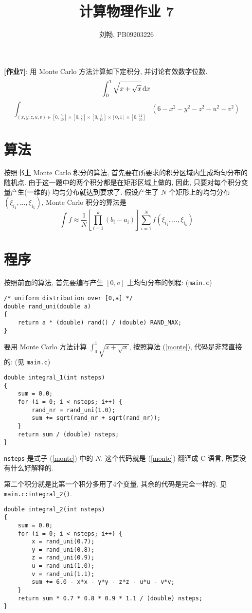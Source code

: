 \documentclass{ctexart}
\def\dd{{\rm d}}
\begin{document}
\title{计算物理作业 7}
\author{刘畅, PB09203226}
\maketitle

{\bf [作业7]}: 用 Monte Carlo 方法计算如下定积分, 并讨论有效数字位数.
\[
\int^1_0 \sqrt{x+\sqrt{x}}\,\dd x
\]
\[
\int_{(x,y,z,u,v)\in[0,\frac{7}{10}]\times[0,\frac{4}{5}]\times[0,\frac{9}{10}]\times[0,1]\times[0,\frac{11}{10}]}
(6-x^2-y^2-z^2-u^2-v^2)
\]
\section{算法}
按照书上 Monte Carlo 积分的算法, 首先要在所要求的积分区域内生成均匀分布的随机点.
由于这一题中的两个积分都是在矩形区域上做的, 因此, 只要对每个积分变量产生(一维的)
均匀分布就达到要求了. 假设产生了 $N$ 个矩形上的均匀分布 $(\xi_{i_1},\ldots,\xi_{i_k})$,
Monte Carlo 积分的算法是
\[\label{monte}
\int f \approx \frac{1}{N}\left[\prod_{i=1}^{k}(b_i-a_i)\right] \sum_{i=1}^{N}
f(\xi_{i_1},\ldots,\xi_{i_k})
\]

\section{程序}
按照前面的算法, 首先要编写产生 $[0,a]$ 上均匀分布的例程: (\verb|main.c|)
\begin{verbatim}
/* uniform distribution over [0,a] */
double rand_uni(double a)
{
    return a * (double) rand() / (double) RAND_MAX;
}
\end{verbatim}

要用 Monte Carlo 方法计算 $\int^1_0\sqrt{x+\sqrt{x}}$,
按照算法 (\ref{monte}), 代码是非常直接的: (见 \verb|main.c|)
\begin{verbatim}
double integral_1(int nsteps)
{
    sum = 0.0;
    for (i = 0; i < nsteps; i++) {
        rand_nr = rand_uni(1.0);
        sum += sqrt(rand_nr + sqrt(rand_nr));
    }
    return sum / (double) nsteps;
}
\end{verbatim}
\verb|nsteps| 是式子 (\ref{monte}) 中的 $N$. 这个代码就是 (\ref{monte})
翻译成 C 语言, 所要没有什么好解释的.

第二个积分就是比第一个积分多用了4个变量, 其余的代码是完全一样的. 见
\verb|main.c:integral_2()|.
\begin{verbatim}
double integral_2(int nsteps)
{
    sum = 0.0;
    for (i = 0; i < nsteps; i++) {
        x = rand_uni(0.7);
        y = rand_uni(0.8);
        z = rand_uni(0.9);
        u = rand_uni(1.0);
        v = rand_uni(1.1);
        sum += 6.0 - x*x - y*y - z*z - u*u - v*v;
    }
    return sum * 0.7 * 0.8 * 0.9 * 1.1 / (double) nsteps;
}
\end{verbatim}
\end{document}
